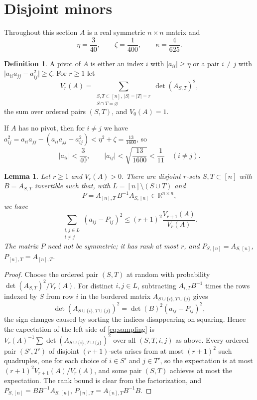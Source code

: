 \documentclass[11pt]{amsart}
\numberwithin{equation}{section}
\newtheorem{lemma}[theorem]{Lemma}
\theoremstyle{definition}
\newtheorem{definition}[theorem]{Definition}
\theoremstyle{remark}
\newcommand{\R}{\mathbb R}
\newcommand{\1}{\mathbf 1}
\newcommand{\abs}[1]{\lvert #1\rvert}
\begin{document}
\section{Disjoint minors}\label{sec:minors}

Throughout this section $A$ is a real symmetric $n\times n$ matrix and
\begin{equation}\label{eq:parameters}
\eta=\frac3{40},\qquad\zeta=\frac1{400},\qquad\kappa=\frac4{625}.
\end{equation}

\begin{definition}\label{def:pivot}
A pivot of $A$ is either an index $i$ with $\abs{a_{ii}}\ge\eta$ or a pair $i\ne j$ with $\abs{a_{ii}a_{jj}-a_{ij}^2}\ge\zeta$. For $r\ge1$ let
\[
V_r(A)=\sum_{\substack{S,T\subset[n],\ \abs S=\abs T=r\\ S\cap T=\varnothing}}\det(A_{S,T})^2,
\]
the sum over ordered pairs $(S,T)$, and $V_0(A)=1$.
\end{definition}

If $A$ has no pivot, then for $i\ne j$ we have $a_{ij}^2=a_{ii}a_{jj}-(a_{ii}a_{jj}-a_{ij}^2)<\eta^2+\zeta=\frac{13}{1600}$, so
\begin{equation}\label{eq:small}
\abs{a_{ii}}<\frac3{40},\qquad\abs{a_{ij}}<\sqrt{\frac{13}{1600}}<\frac1{11}\quad(i\ne j).
\end{equation}

\begin{lemma}\label{lem:sampling}
Let $r\ge1$ and $V_r(A)>0$. There are disjoint $r$-sets $S,T\subset[n]$ with $B=A_{S,T}$ invertible such that, with $L=[n]\setminus(S\cup T)$ and
\[
P=A_{[n],T}\,B^{-1}A_{S,[n]}\in\R^{n\times n},
\]
we have
\begin{equation}\label{eq:sampling}
\sum_{\substack{i,j\in L\\ i\ne j}}(a_{ij}-P_{ij})^2\le(r+1)^2\frac{V_{r+1}(A)}{V_r(A)}.
\end{equation}
The matrix $P$ need not be symmetric; it has rank at most $r$, and $P_{S,[n]}=A_{S,[n]}$, $P_{[n],T}=A_{[n],T}$.
\end{lemma}

\begin{proof}
Choose the ordered pair $(S,T)$ at random with probability $\det(A_{S,T})^2/V_r(A)$. For distinct $i,j\in L$, subtracting $A_{i,T}B^{-1}$ times the rows indexed by $S$ from row $i$ in the bordered matrix $A_{S\cup\{i\},T\cup\{j\}}$ gives
\[
\det(A_{S\cup\{i\},T\cup\{j\}})^2=\det(B)^2(a_{ij}-P_{ij})^2,
\]
the sign changes caused by sorting the indices disappearing on squaring. Hence the expectation of the left side of \eqref{eq:sampling} is $V_r(A)^{-1}\sum\det(A_{S\cup\{i\},T\cup\{j\}})^2$ over all $(S,T,i,j)$ as above. Every ordered pair $(S',T')$ of disjoint $(r+1)$-sets arises from at most $(r+1)^2$ such quadruples, one for each choice of $i\in S'$ and $j\in T'$, so the expectation is at most $(r+1)^2V_{r+1}(A)/V_r(A)$, and some pair $(S,T)$ achieves at most the expectation. The rank bound is clear from the factorization, and $P_{S,[n]}=BB^{-1}A_{S,[n]}$, $P_{[n],T}=A_{[n],T}B^{-1}B$.
\end{proof}
\end{document}
